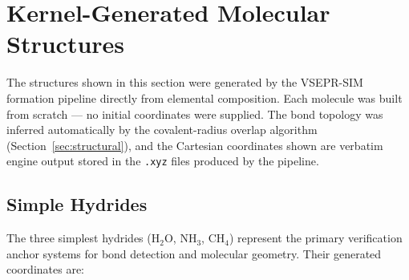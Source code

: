 \documentclass[11pt,twoside]{article}
\begin{document}
\section{Kernel-Generated Molecular Structures}
\label{sec:molecules}

The structures shown in this section were generated by the VSEPR-SIM formation pipeline directly from elemental composition. Each molecule was built from scratch --- no initial coordinates were supplied. The bond topology was inferred automatically by the covalent-radius overlap algorithm (Section~\ref{sec:structural}), and the Cartesian coordinates shown are verbatim engine output stored in the \texttt{.xyz} files produced by the pipeline.

\subsection{Simple Hydrides}

The three simplest hydrides (H$_2$O, NH$_3$, CH$_4$) represent the primary verification anchor systems for bond detection and molecular geometry. Their generated coordinates are:
\end{document}
